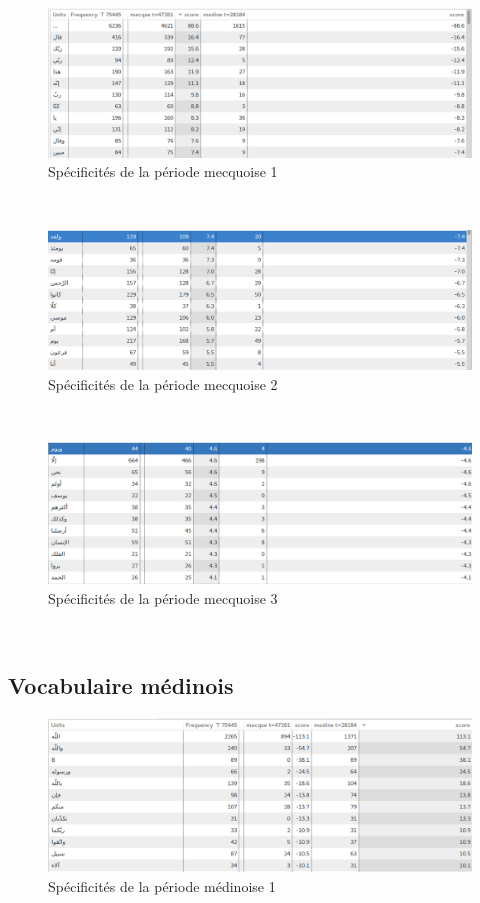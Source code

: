 \documentclass[a4paper,11pt]{report}
\begin{document}
\begin{figure}[H]
\centering
\includegraphics[width=.9\linewidth]{./img/spec_mecque_1.png}
\caption{Spécificités de la période mecquoise 1}
\end{figure} \\

\begin{figure}[H]
\centering
\includegraphics[width=.9\linewidth]{./img/spec_mecque_2.png}
\caption{Spécificités de la période mecquoise 2}
\end{figure} \\

\begin{figure}[H]
\centering
\includegraphics[width=.9\linewidth]{./img/spec_mecque_3.png}
\caption{Spécificités de la période mecquoise 3}
\end{figure} \\


\subsection{Vocabulaire médinois}
\label{sec-2-2-2}

\begin{figure}[H]
\centering
\includegraphics[width=.9\linewidth]{./img/spec_medine_1.png}
\caption{Spécificités de la période médinoise 1}
\end{figure} \\
\end{document}

